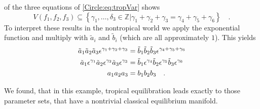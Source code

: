 	of the three equations of \eqref{Circle:eq:tropVar} shows
	\begin{equation}
	V(f_1,f_2,f_3) \subseteq
	\left\{\gamma_1,\ldots,\delta_3 \in\mathbb{Z} \big|
	\gamma_1+\gamma_2 + \gamma_3 = \gamma_4 + \gamma_5 + \gamma_6 \right\} \quad .
	\end{equation}
	To interpret these results in the nontropical world we apply the exponential 
	function and multiply with $\tilde{a}_i$ and $\tilde{b}_i$ (which are all 
	approximately $1$). This yields
	\begin{align}
	\tilde{a}_1\tilde{a}_2\tilde{a}_3 \epsilon^{\gamma_1+\gamma_2+\gamma_3} &=
	\tilde{b}_1\tilde{b}_2\tilde{b}_3 \epsilon^{\gamma_4+\gamma_5+\gamma_6} \notag \\
	\tilde{a}_1\epsilon^{\gamma_1}\tilde{a}_2\epsilon^{\gamma_2}
	\tilde{a}_3\epsilon^{\gamma_3} &=	\tilde{b}_1\epsilon^{\gamma_4} \notag
	\tilde{b}_2\epsilon^{\gamma_5}\tilde{b}_3\epsilon^{\gamma_6}\\
	a_1a_2a_3 &= b_1b_2b_3 \quad .
	\end{align}
	
	We found, that in this example, tropical equilibration leads exactly to 
	those parameter sets, that have a nontrivial classical equilibrium manifold.
	